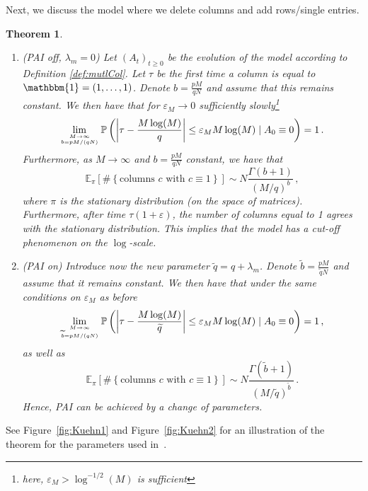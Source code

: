 \documentclass{article}
\numberwithin{equation}{section}
\newcommand{\gk}[1]{\left\{#1\right\}}
\newcommand\mycom[2]{\genfrac{}{}{0pt}{}{#1}{#2}}
\newcommand{\ek}[1]{\left[#1\right]}
\newcommand{\rk}[1]{\left(#1\right)}
\newcommand{\abs}[1]{\left| #1 \right|}
\renewcommand{\P}   {\mathbb{P}}
\newcommand{\E}     {\mathbb{E}}
\renewcommand{\l}{\lambda}
\newcommand{\e}{\varepsilon}
\newcommand{\1}{\mathbbm{1}}
\renewcommand{\P}{\mathbb{P}}
\newtheorem{theorem}{Theorem}
\begin{document}
Next, we discuss the model where we delete columns and add rows/single entries.
\begin{theorem}\label{thm:multCol}
\begin{enumerate}
    \item(PAI off, $\l_m=0$)
    Let $(A_t)_{t\ge 0}$ be the evolution of the model according to Definition \ref{def:mutlCol}. Let $\tau$ be the first time a column is equal to $\1=(1,\ldots,1)$. Denote $b=\tfrac{pM}{qN}$ and assume that this remains constant. We then have that for $\e_M\to 0$ sufficiently slowly\footnote{here, $\e_M>\log^{-1/2}(M)$ is sufficient}
    \begin{equation}\label{eq:transTimePAIoff}
        \lim_{\mycom{M\to\infty}{b={pM}/\rk{qN}}}\P\rk{\abs{\tau-\frac{M\log(M)}{q}}\le \e_M M\log(M)\mid A_0\equiv 0}=1\, .
    \end{equation}
    Furthermore, as $M\to\infty $ and $b=\tfrac{pM}{qN}$ constant, we have that
    \begin{equation}\label{eq:RationPAIoff}
        \E_\pi\ek{\#\gk{\text{columns }c\text{ with }c\equiv 1}}\sim N\frac{\Gamma(b+1)}{ (M/q)^{b}}\, ,
    \end{equation}
    where $\pi$ is the stationary distribution (on the space of matrices). Furthermore, after time $\tau(1+\e)$, the number of columns equal to 1 agrees with the stationary distribution. This implies that the model has a cut-off phenomenon on the $\log$-scale.
    \item(PAI on) Introduce now the new parameter $\widetilde{q}=q+\lambda_m$. Denote $\widetilde{b}=\tfrac{{p}M}{\widetilde{q}N}$ and assume that it remains constant. We then have that under the same conditions on $\e_M$ as before
    \begin{equation}
         \lim_{\mycom{M\to\infty}{\widetilde{b}={pM}/\rk{qN}}}\P\rk{\abs{\tau-\frac{M\log(M)}{\widetilde{q}}}\le \e_M M\log(M)\mid A_0\equiv 0}=1\, ,
    \end{equation}
    as well as
    \begin{equation}
        \E_\pi\ek{\#\gk{\text{columns }c\text{ with }c\equiv 1}}\sim N\frac{\Gamma\rk{\widetilde{b}+1}}{ (M/\widetilde{q})^{\widetilde{b}}}\, .
    \end{equation}
    Hence, PAI can be achieved by a change of parameters.
\end{enumerate}
\end{theorem}
See Figure~\ref{fig:Kuehn1} and Figure~\ref{fig:Kuehn2} for an illustration of the theorem for the parameters used in~\cite{kuehn2025mathematicalmodelsselfadaptiveresponse}.
\end{document}
